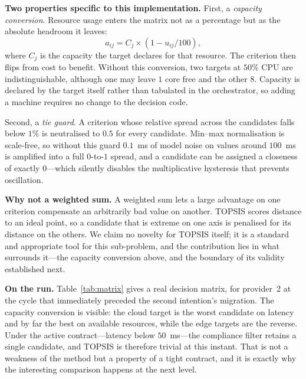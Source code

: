 \documentclass[conference]{IEEEtran}
\begin{document}
\textbf{Two properties specific to this implementation.} First, a
\emph{capacity conversion}. Resource usage enters the matrix not as a
percentage but as the absolute headroom it leaves:
\begin{equation}
a_{ij} = C_j \times \left(1 - u_{ij}/100\right),
\label{eq:capacity}
\end{equation}
where $C_j$ is the capacity the target declares for that resource. The
criterion then flips from cost to benefit. Without this conversion, two
targets at $50\%$ CPU are indistinguishable, although one may leave $1$ core
free and the other $8$. Capacity is declared by the target itself rather than
tabulated in the orchestrator, so adding a machine requires no change to the
decision code.

Second, a \emph{tie guard}. A criterion whose relative spread across the
candidates falls below $1\%$ is neutralised to $0.5$ for every candidate.
Min--max normalisation is scale-free, so without this guard $0.1$~ms of model
noise on values around $100$~ms is amplified into a full $0$-to-$1$ spread,
and a candidate can be assigned a closeness of exactly $0$---which silently
disables the multiplicative hysteresis that prevents oscillation.

\textbf{Why not a weighted sum.} A weighted sum lets a large advantage on one
criterion compensate an arbitrarily bad value on another. TOPSIS scores
distance to an ideal point, so a candidate that is extreme on one axis is
penalised for its distance on the others. We claim no novelty for TOPSIS
itself; it is a standard and appropriate tool for this sub-problem, and the
contribution lies in what surrounds it---the capacity conversion above, and
the boundary of its validity established next.

\textbf{On the run.} Table~\ref{tab:matrix} gives a real decision matrix, for
provider~2 at the cycle that immediately preceded the second intention's
migration. The capacity conversion is visible: the cloud target is the worst
candidate on latency and by far the best on available resources, while the
edge targets are the reverse. Under the active contract---latency below
$50$~ms---the compliance filter retains a single candidate, and TOPSIS is
therefore trivial at this instant. That is not a weakness of the method but a
property of a tight contract, and it is exactly why the interesting comparison
happens at the next level.
\end{document}
